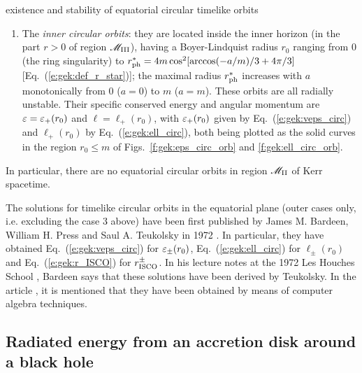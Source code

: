\begin{tprop}{existence and stability of equatorial circular timelike orbits}{}
\begin{enumerate}
$r_{\rm ph}^- < r_0 \leq r_{\rm ISCO}^-$ and stable for $r_0 > r_{\rm ISCO}^-$,
where $r_{\rm ISCO}^-$ is given by Eq.~(\ref{e:gek:r_ISCO}),
increasing monotonically from $6m$ ($a=0$) to $9m$ ($a=m$).
Their specific conserved energy and angular momentum
are $\veps = \veps_-(r_0) > 0$ and $\ell = \ell_-(r_0) < 0$, with
$\veps_-(r_0)$ given by Eq.~(\ref{e:gek:veps_circ}) and $\ell_-(r_0)$ by
Eq.~(\ref{e:gek:ell_circ}), both being plotted as the dashed
curves in Figs.~\ref{f:gek:eps_circ_orb} and \ref{f:gek:ell_circ_orb}.
The functions $\veps_-(r_0)$ and $|\ell_-(r_0)|$ are minimal at the ISCO.
\item The \emph{inner circular orbits}: they are located inside the inner horizon
(in the part $r>0$ of region $\mathscr{M}_{\rm III}$),
having a Boyer-Lindquist radius $r_0$ ranging
from $0$ (the ring singularity) to
$r_{\rm ph}^* = 4 m \cos^2[\arccos(-a/m)/3 + 4\pi/3]$
[Eq.~(\ref{e:gek:def_r_star})];
the maximal radius $r_{\rm ph}^*$ increases with $a$ monotonically from $0$ ($a=0$) to $m$ ($a=m$).
These orbits are all radially unstable. Their specific conserved energy and angular momentum
are $\varepsilon = \varepsilon_+(r_0)$ and $\ell = \ell_+(r_0)$, with
$\varepsilon_+(r_0)$ given by Eq.~(\ref{e:gek:veps_circ}) and $\ell_+(r_0)$ by
Eq.~(\ref{e:gek:ell_circ}), both being plotted as the solid
curves in the region $r_0 \leq m$ of Figs.~\ref{f:gek:eps_circ_orb} and \ref{f:gek:ell_circ_orb}.
\end{enumerate}
In particular, there are no equatorial circular orbits in region $\mathscr{M}_{\rm II}$ of Kerr spacetime.
\end{tprop}

\begin{hist}
The solutions for timelike circular orbits in the equatorial plane
(outer cases only, i.e. excluding the case 3 above) have been first published
by James M. Bardeen, William H. Press and Saul A. Teukolsky in 1972 \cite{BardePT72}.
In particular, they have obtained Eq.~(\ref{e:gek:veps_circ}) for $\varepsilon_\pm(r_0)$,
Eq.~(\ref{e:gek:ell_circ}) for $\ell_\pm(r_0)$ and Eq.~(\ref{e:gek:r_ISCO})
for $r_{\rm ISCO}^\pm$.
In his lecture notes at the 1972 Les Houches School \cite{Barde73a}, Bardeen says that these solutions have been derived by Teukolsky.
In the article \cite{BardePT72}, it is mentioned that they have been obtained by means of
computer algebra techniques.
\end{hist}


\subsection{Radiated energy from an accretion disk around a black hole}
\label{s:gek:radiated_energy}

